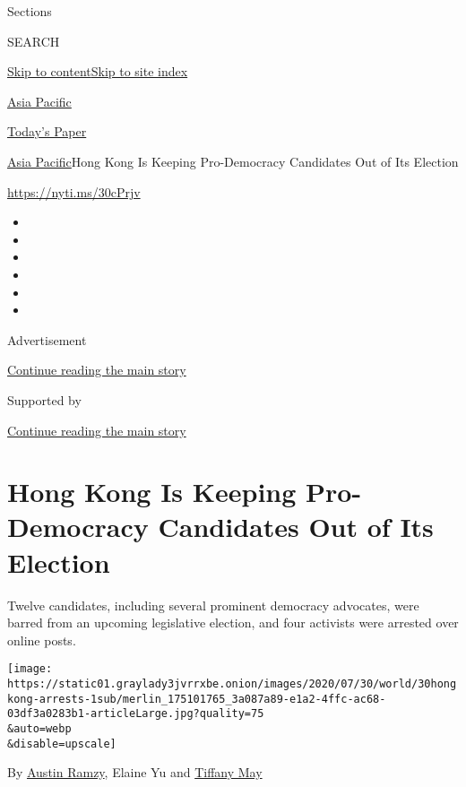 Sections

SEARCH

\protect\hyperlink{site-content}{Skip to
content}\protect\hyperlink{site-index}{Skip to site index}

\href{https://www.nytimes3xbfgragh.onion/section/world/asia}{Asia
Pacific}

\href{https://myaccount.nytimes3xbfgragh.onion/auth/login?response_type=cookie\&client_id=vi}{}

\href{https://www.nytimes3xbfgragh.onion/section/todayspaper}{Today's
Paper}

\href{/section/world/asia}{Asia Pacific}\textbar{}Hong Kong Is Keeping
Pro-Democracy Candidates Out of Its Election

\url{https://nyti.ms/30cPrjv}

\begin{itemize}
\item
\item
\item
\item
\item
\item
\end{itemize}

Advertisement

\protect\hyperlink{after-top}{Continue reading the main story}

Supported by

\protect\hyperlink{after-sponsor}{Continue reading the main story}

\hypertarget{hong-kong-is-keeping-pro-democracy-candidates-out-of-its-election}{%
\section{Hong Kong Is Keeping Pro-Democracy Candidates Out of Its
Election}\label{hong-kong-is-keeping-pro-democracy-candidates-out-of-its-election}}

Twelve candidates, including several prominent democracy advocates, were
barred from an upcoming legislative election, and four activists were
arrested over online posts.

\texttt{[image: https://static01.graylady3jvrrxbe.onion/images/2020/07/30/world/30hongkong-arrests-1sub/merlin\_175101765\_3a087a89-e1a2-4ffc-ac68-03df3a0283b1-articleLarge.jpg?quality=75\\\&auto=webp\\\&disable=upscale]}

By \href{https://www.nytimes3xbfgragh.onion/by/austin-ramzy}{Austin
Ramzy}, Elaine Yu and
\href{https://www.nytimes3xbfgragh.onion/by/tiffany-may}{Tiffany May}

